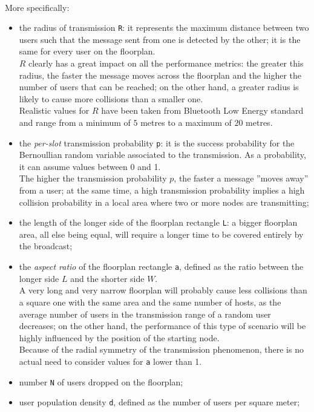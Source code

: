 \\
More specifically:
\begin{itemize}
	\item the radius of transmission \colorbox{gray!30}{\large \texttt{R}}: it
	represents the maximum distance between two users such that the message
	sent from one is detected by the other; it is the same for every user on
	the floorplan.\\
	$R$ clearly has a great impact on all
    the performance metrics: the greater this radius, the faster the message
    moves across the floorplan and the higher the number of users that can be
    reached; on the other hand, a greater radius is likely to cause more
    collisions than a smaller one. \\
	 Realistic values for $R$ have been taken from Bluetooth Low
	Energy standard and range from a minimum of $5$ metres to a maximum of $20$
	metres.
	\item the \textit{per-slot} transmission probability
	\colorbox{gray!30}{\large \texttt{p}}: it is the success probability for the
	Bernoullian random variable associated to the transmission. As a
	probability, it can assume values between 0 and 1.\\
	The higher the transmission probability $p$, the faster a message ”moves away”
	from a user; at the same time, a high transmission probability implies a
	high collision probability in a local area where two or more nodes are
	transmitting;
    \item the length of the longer side of the floorplan rectangle
    \colorbox{gray!30}{\large \texttt{L}}: a bigger floorplan area, all else
    being equal, will require a longer time to be covered entirely by the
    broadcast;
	\item the \textit{aspect ratio} of the floorplan rectangle
	\colorbox{gray!30}{\large \texttt{a}}, defined as the ratio between the
	longer side $L$ and the shorter side $W$.\\
	A very long and very narrow floorplan will probably cause less collisions than a
square one with the same area and the same number of hosts, as the average number of users in the transmission
range of a random user decreases; on the other hand, the performance of this type of
scenario will be highly influenced by the position of the starting node.\\
	Because of the radial symmetry of
	the transmission phenomenon, there is no actual need to consider values for
	\texttt{a} lower than 1.
	\item number \colorbox{gray!30}{\large \texttt{N}} of users dropped on the floorplan;
	\item user population density \colorbox{gray!30}{\large \texttt{d}},
	defined as the number of users per square meter;
\end{itemize}
